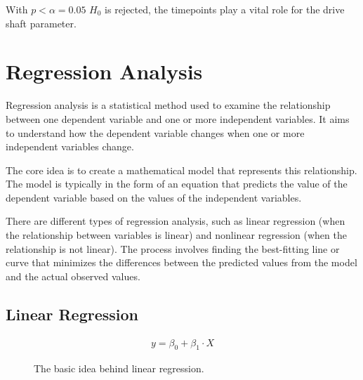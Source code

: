 \documentclass[
  a4paper,
]{scrbook}
\begin{document}
With \(p<\alpha = 0.05\) \(H_0\) is rejected, the timepoints play a
vital role for the drive shaft parameter.


\chapter{Regression Analysis}\label{regression-analysis}

Regression analysis is a statistical method used to examine the
relationship between one dependent variable and one or more independent
variables. It aims to understand how the dependent variable changes when
one or more independent variables change.

The core idea is to create a mathematical model that represents this
relationship. The model is typically in the form of an equation that
predicts the value of the dependent variable based on the values of the
independent variables.

There are different types of regression analysis, such as linear
regression (when the relationship between variables is linear) and
nonlinear regression (when the relationship is not linear). The process
involves finding the best-fitting line or curve that minimizes the
differences between the predicted values from the model and the actual
observed values.

\section{Linear Regression}\label{linear-regression}

\begin{align}
y = \beta_0 + \beta_1 \cdot X \label{linreg}
\end{align}

\begin{figure}[H]


\caption{\label{fig-lm-principle}The basic idea behind linear
regression.}

\end{figure}%
\end{document}
